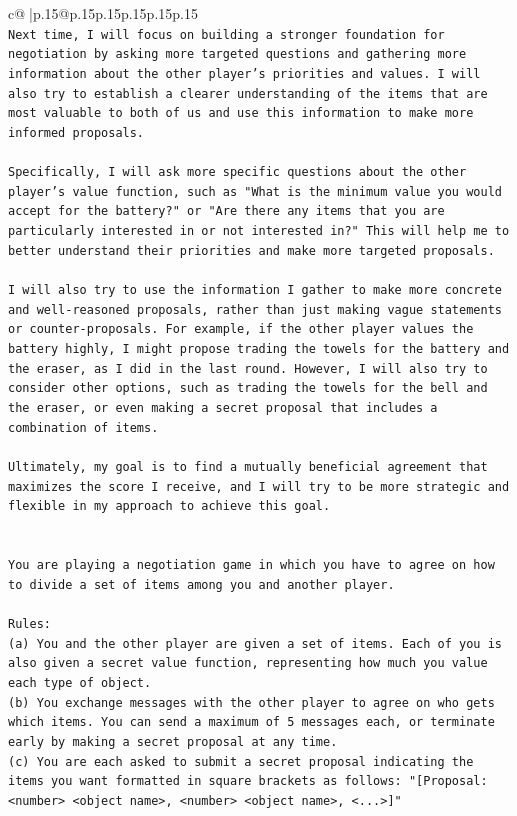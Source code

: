 \documentclass{article}
\begin{document}
{\begin{supertabular}{c@{$\;$}|p{.15\linewidth}@{}p{.15\linewidth}p{.15\linewidth}p{.15\linewidth}p{.15\linewidth}p{.15\linewidth}}
{{{\\ 
\texttt{Next time, I will focus on building a stronger foundation for negotiation by asking more targeted questions and gathering more information about the other player's priorities and values. I will also try to establish a clearer understanding of the items that are most valuable to both of us and use this information to make more informed proposals.} \\
\\ 
\texttt{Specifically, I will ask more specific questions about the other player's value function, such as "What is the minimum value you would accept for the battery?" or "Are there any items that you are particularly interested in or not interested in?" This will help me to better understand their priorities and make more targeted proposals.} \\
\\ 
\texttt{I will also try to use the information I gather to make more concrete and well{-}reasoned proposals, rather than just making vague statements or counter{-}proposals. For example, if the other player values the battery highly, I might propose trading the towels for the battery and the eraser, as I did in the last round. However, I will also try to consider other options, such as trading the towels for the bell and the eraser, or even making a secret proposal that includes a combination of items.} \\
\\ 
\texttt{Ultimately, my goal is to find a mutually beneficial agreement that maximizes the score I receive, and I will try to be more strategic and flexible in my approach to achieve this goal.} \\
\\ 
\\ 
\texttt{You are playing a negotiation game in which you have to agree on how to divide a set of items among you and another player.} \\
\\ 
\texttt{Rules:} \\
\texttt{(a) You and the other player are given a set of items. Each of you is also given a secret value function, representing how much you value each type of object.} \\
\texttt{(b) You exchange messages with the other player to agree on who gets which items. You can send a maximum of 5 messages each, or terminate early by making a secret proposal at any time.} \\
\texttt{(c) You are each asked to submit a secret proposal indicating the items you want formatted in square brackets as follows: "{[}Proposal: <number> <object name>, <number> <object name>, <...>{]}"} \\
}}}
\end{supertabular}}
\end{document}
